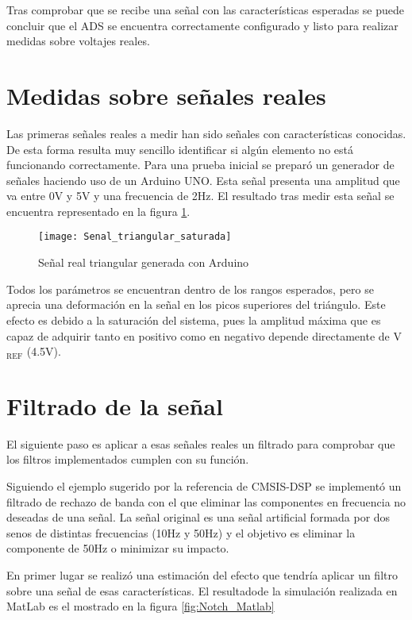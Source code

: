 Tras comprobar que se recibe una señal con las características esperadas se puede concluir que el ADS se encuentra correctamente configurado y listo para realizar medidas sobre voltajes reales.

\section{Medidas sobre señales reales\label{Resultados_Medida_Real}}

Las primeras señales reales a medir han sido señales con características conocidas. De esta forma resulta muy sencillo identificar si algún elemento no está funcionando correctamente. Para una prueba inicial se preparó un generador de señales haciendo uso de un Arduino UNO. Esta señal presenta una amplitud que va entre 0V y 5V y una frecuencia de 2Hz. El resultado tras medir esta señal se encuentra representado en la figura \ref{fig:Senal_triangular_saturada}.

\begin{figure} [H]
    \centering
    \texttt{[image: Senal\_triangular\_saturada]}
    \caption{Señal real triangular generada con Arduino}
    \label{fig:Senal_triangular_saturada}
\end{figure}

Todos los parámetros se encuentran dentro de los rangos esperados, pero se aprecia una deformación en la señal en los picos superiores del triángulo. Este efecto es debido a la saturación del sistema, pues la amplitud máxima que es capaz de adquirir tanto en positivo como en negativo depende directamente de V$_{\text{REF}}$ (4.5V).

\clearpage

\section{Filtrado de la señal\label{Resultados_filtrado}}

El siguiente paso es aplicar a esas señales reales un filtrado para comprobar que los filtros implementados cumplen con su función.

Siguiendo el ejemplo sugerido por la referencia de CMSIS-DSP se implementó un filtrado de rechazo de banda con el que eliminar las componentes en frecuencia no deseadas de una señal. La señal original es una señal artificial formada por dos senos de distintas frecuencias (10Hz y 50Hz) y el objetivo es eliminar la componente de 50Hz o minimizar su impacto. 

En primer lugar se realizó una estimación del efecto que tendría aplicar un filtro sobre una señal de esas características. El resultadode la simulación realizada en MatLab es el mostrado en la figura \ref{fig:Notch_Matlab}

